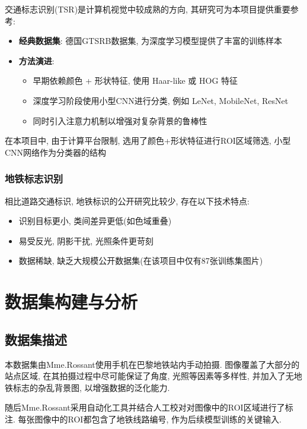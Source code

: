 \documentclass[12pt,a4paper]{article}
\begin{document}
交通标志识别(TSR)是计算机视觉中较成熟的方向, 其研究可为本项目提供重要参考:

\begin{itemize}
    \item \textbf{经典数据集}: 德国GTSRB数据集, 为深度学习模型提供了丰富的训练样本
    \item \textbf{方法演进}:
    \begin{itemize}
        \item 早期依赖颜色 + 形状特征, 使用 Haar-like 或 HOG 特征
        \item 深度学习阶段使用小型CNN进行分类, 例如 LeNet, MobileNet, ResNet
        \item 同时引入注意力机制以增强对复杂背景的鲁棒性
    \end{itemize}
\end{itemize}

在本项目中, 由于计算平台限制, 选用了颜色+形状特征进行ROI区域筛选, 小型CNN网络作为分类器的结构

\subsubsection{地铁标志识别}

相比道路交通标识, 地铁标识的公开研究比较少, 存在以下技术特点:

\begin{itemize}
    \item 识别目标更小, 类间差异更低(如色域重叠)
    \item 易受反光, 阴影干扰, 光照条件更苛刻
    \item 数据稀缺, 缺乏大规模公开数据集(在该项目中仅有87张训练集图片)
\end{itemize}

\newpage

\section{数据集构建与分析}

\subsection{数据集描述}

本数据集由Mme.Rossant使用手机在巴黎地铁站内手动拍摄. 图像覆盖了大部分的站点区域, 在其拍摄过程中尽可能保证了角度, 光照等因素等多样性, 并加入了无地铁标志的杂乱背景图, 以增强数据的泛化能力.

随后Mme.Rossant采用自动化工具并结合人工校对对图像中的ROI区域进行了标注. 每张图像中的ROI都包含了地铁线路编号, 作为后续模型训练的关键输入.
\end{document}
